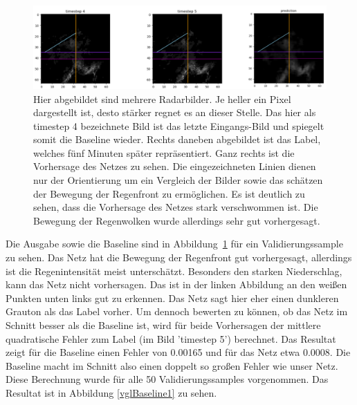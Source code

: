 \begin{figure}[h]
	\centering
	\includegraphics[width=\linewidth]{pics/mse_vgl1}
	\caption[Radarbilder für die fünf-Minuten Vorhersage]{Hier abgebildet sind mehrere Radarbilder. Je heller ein Pixel dargestellt ist, desto stärker regnet es an dieser Stelle. Das hier als timestep 4 bezeichnete Bild ist das letzte Eingangs-Bild und spiegelt somit die Baseline wieder. Rechts daneben abgebildet ist das Label, welches fünf Minuten später repräsentiert. Ganz rechts ist die Vorhersage des Netzes zu sehen. Die eingezeichneten Linien dienen nur der Orientierung um ein Vergleich der Bilder sowie das schätzen der Bewegung der Regenfront zu ermöglichen. Es ist deutlich zu sehen, dass die Vorhersage des Netzes stark verschwommen ist. Die Bewegung der Regenwolken wurde allerdings sehr gut vorhergesagt. }
	\label{mse_VGL1}
\end{figure}

Die Ausgabe sowie die Baseline sind in Abbildung~\ref{mse_VGL1} für ein Validierungssample zu sehen. Das Netz hat die Bewegung der Regenfront gut vorhergesagt, allerdings ist die Regenintensität meist unterschätzt. Besonders den starken Niederschlag, kann das Netz nicht vorhersagen. Das ist in der linken Abbildung an den weißen Punkten unten links gut zu erkennen. Das Netz sagt hier eher einen dunkleren Grauton als das Label vorher. Um dennoch bewerten zu können, ob das Netz im Schnitt besser als die Baseline ist, wird für beide Vorhersagen der mittlere quadratische Fehler zum Label (im Bild 'timestep 5') berechnet. Das Resultat zeigt für die Baseline einen Fehler von 0.00165 und für das Netz etwa 0.0008. Die Baseline macht im Schnitt also einen doppelt so großen Fehler wie unser Netz. Diese Berechnung wurde für alle 50 Validierungssamples vorgenommen. Das Resultat ist in Abbildung \ref{vglBaseline1} zu sehen.

